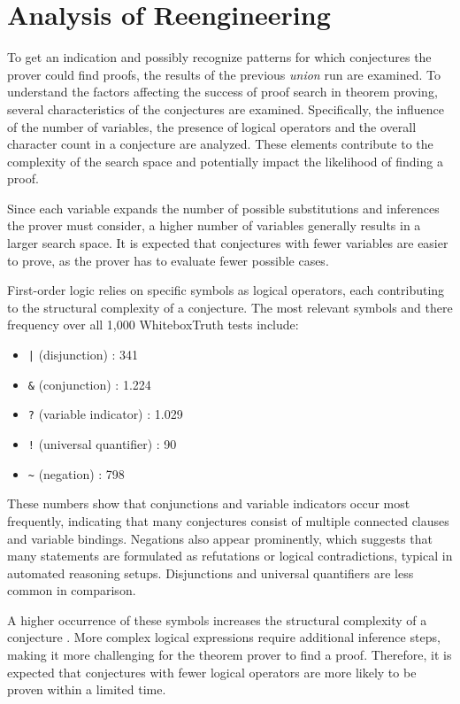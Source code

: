 \documentclass[english,version-2020-11]{uzl-thesis}
\begin{document}
\section{Analysis of Reengineering}

To get an indication and possibly recognize patterns for which conjectures the prover could find proofs, the results of the previous \textit{union} run are examined. To understand the factors affecting the success of proof search in theorem proving, several characteristics of the conjectures are examined. Specifically, the influence of the number of variables, the presence of logical operators and the overall character count in a conjecture are analyzed. These elements contribute to the complexity of the search space and potentially impact the likelihood of finding a proof.

Since each variable expands the number of possible substitutions and inferences the prover must consider, a higher number of variables generally results in a larger search space. It is expected that conjectures with fewer variables are easier to prove, as the prover has to evaluate fewer possible cases.

First-order logic relies on specific symbols as logical operators, each contributing to the structural complexity of a conjecture. The most relevant symbols and there frequency over all 1,000 WhiteboxTruth tests include:
\begin{itemize}
    \item \texttt{|} (disjunction) : 341
    \item \texttt{\&} (conjunction) : 1.224
    \item \texttt{?} (variable indicator) : 1.029
    \item \texttt{!} (universal quantifier) : 90
    \item \texttt{\~{}} (negation) : 798
\end{itemize}

These numbers show that conjunctions and variable indicators occur most frequently, indicating that many conjectures consist of multiple connected clauses and variable bindings. Negations also appear prominently, which suggests that many statements are formulated as refutations or logical contradictions, typical in automated reasoning setups. Disjunctions and universal quantifiers are less common in comparison.


A higher occurrence of these symbols increases the structural complexity of a conjecture \cite{Dantsin2001}. More complex logical expressions require additional inference steps, making it more challenging for the theorem prover to find a proof. Therefore, it is expected that conjectures with fewer logical operators are more likely to be proven within a limited time.
\end{document}
